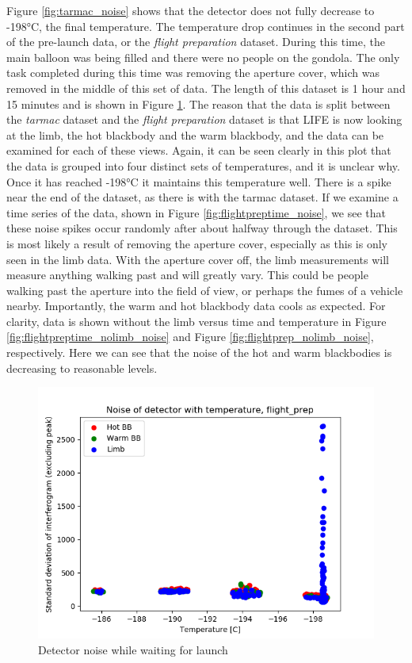 Figure \ref{fig:tarmac_noise} shows that the detector does not fully decrease to -198°C, the final temperature. The temperature drop continues in the second part of the pre-launch data, or the \textit{flight preparation} dataset. During this time, the main balloon was being filled and there were no people on the gondola. The only task completed during this time was removing the aperture cover, which was removed in the middle of this set of data. The length of this dataset is 1 hour and 15 minutes and is shown in Figure \ref{fig:flightprep_noise}. The reason that the data is split between the \textit{tarmac} dataset and the \textit{flight preparation} dataset is that LIFE is now looking at the limb, the hot blackbody and the warm blackbody, and the data can be examined for each of these views. Again, it can be seen clearly in this plot that the data is grouped into four distinct sets of temperatures, and it is unclear why. Once it has reached -198°C it maintains this temperature well. There is a spike near the end of the dataset, as there is with the tarmac dataset. If we examine a time series of the data, shown in Figure \ref{fig:flightpreptime_noise}, we see that these noise spikes occur randomly after about halfway through the dataset. This is most likely a result of removing the aperture cover, especially as this is only seen in the limb data. With the aperture cover off, the limb measurements will measure anything walking past and will greatly vary. This could be people walking past the aperture into the field of view, or perhaps the fumes of a vehicle nearby. Importantly, the warm and hot blackbody data cools as expected. For clarity, data is shown without the limb versus time and temperature in Figure \ref{fig:flightpreptime_nolimb_noise} and Figure \ref{fig:flightprep_nolimb_noise}, respectively. Here we can see that the noise of the hot and warm blackbodies is decreasing to reasonable levels.

\begin{figure}
  \centering
  \includegraphics[width=0.8\linewidth]{mct_noise_temp_plots/flight_prep_noisevstemp_invertedx_colours.png}
  \caption{Detector noise while waiting for launch}
  \label{fig:flightprep_noise}
\end{figure}

